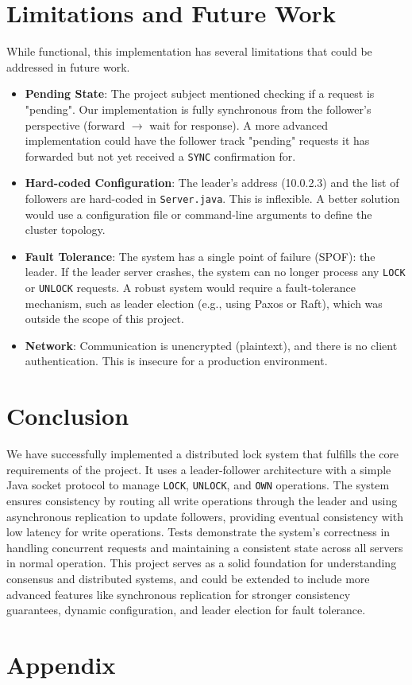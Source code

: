 \documentclass[a4paper,11pt]{article}
\begin{document}
\section{Limitations and Future Work}
While functional, this implementation has several limitations that could be addressed in future work.
\begin{itemize}
    \item \textbf{Pending State}: The project subject mentioned checking if a request is "pending". Our implementation is fully synchronous from the follower's perspective (forward $\rightarrow$ wait for response). A more advanced implementation could have the follower track "pending" requests it has forwarded but not yet received a \texttt{SYNC} confirmation for.
    \item \textbf{Hard-coded Configuration}: The leader's address (10.0.2.3) and the list of followers are hard-coded in \texttt{Server.java}. This is inflexible. A better solution would use a configuration file or command-line arguments to define the cluster topology.
    \item \textbf{Fault Tolerance}: The system has a single point of failure (SPOF): the leader. If the leader server crashes, the system can no longer process any \texttt{LOCK} or \texttt{UNLOCK} requests. A robust system would require a fault-tolerance mechanism, such as leader election (e.g., using Paxos or Raft), which was outside the scope of this project.
    \item \textbf{Network}: Communication is unencrypted (plaintext), and there is no client authentication. This is insecure for a production environment.
\end{itemize}

\section{Conclusion}
We have successfully implemented a distributed lock system that fulfills the core requirements of the project. It uses a leader-follower architecture with a simple Java socket protocol to manage \texttt{LOCK}, \texttt{UNLOCK}, and \texttt{OWN} operations. The system ensures consistency by routing all write operations through the leader and using asynchronous replication to update followers, providing eventual consistency with low latency for write operations. Tests demonstrate the system's correctness in handling concurrent requests and maintaining a consistent state across all servers in normal operation. This project serves as a solid foundation for understanding consensus and distributed systems, and could be extended to include more advanced features like synchronous replication for stronger consistency guarantees, dynamic configuration, and leader election for fault tolerance.

\section{Appendix}
\end{document}
